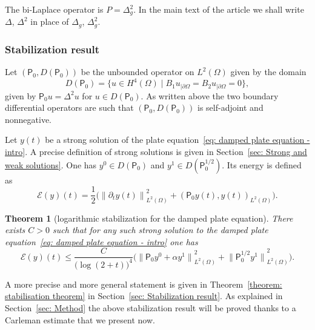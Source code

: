 \documentclass[10pt]{amsart}
\let\sep\mid
\theoremstyle{plain}
\newtheorem{theorem}{Theorem}[section]
\theoremstyle{definition}
\newcommand{\inp}[2]{(#1, #2)}
\newcommand{\E}{\ensuremath{\mathcal E}}
\newcommand{\Norm}[2]{{\| #1 \|}_{#2}}
\newcommand{\Pell}{\mathsf P_0}
\begin{document}
The bi-Laplace operator is $P= \Delta^2_g$. In the main text of the
article we shall write $\Delta$, $\Delta^2$ in place of $\Delta_g$, $\Delta_g^2$.

\subsubsection{Stabilization result}

Let $(\Pell, D(\Pell))$ be the unbounded operator on $L^2(\Omega)$ given by the domain
\begin{equation}
\label{eq: domain P intro}
D(\Pell) = \big\{ u \in H^4(\Omega)\sep B_1
u_{|\partial \Omega}
= B_2 u_{|\partial \Omega}=0\big\},
\end{equation}
given by $\Pell u = \Delta^2 u$ for $u \in D(\Pell)$. As written above
the two boundary differential operators are such that $(\Pell, D(\Pell))$
is self-adjoint and nonnegative.

Let $y(t)$ be a strong solution of the plate equation~\eqref{eq:
damped plate equation - intro}. A precise definition of strong
solutions is given in Section~\ref{sec: Strong and weak
solutions}. One has $y^0 \in D(\Pell)$ and
$y^1 \in D(\Pell^{1/2})$. Its energy is defined as
\begin{equation*}
\E(y) (t) = \frac12 \big(\Norm{\partial_t y (t)}{L^2(\Omega)}^2
+ \inp{\Pell y (t)}{y (t)}_{L^2(\Omega)}
\big).
\end{equation*}

\begin{theorem}[logarithmic stabilization for the damped plate equation]
\label{theorem: stabilisation theorem-intro}
There exists $C>0$ such that for any such strong solution to the
damped plate equation~\eqref{eq: damped plate equation - intro} one
has
\begin{equation*}
\E(y)(t) \leq \frac{C}{\big(\log(2+t)\big)^{4}}
\big(\Norm{\Pell y^0+ \alpha y^1}{L^2(\Omega)}^2
+ \Norm{\Pell^{1/2} y^1}{L^2(\Omega)}^2
\big).
\end{equation*}
\end{theorem}
A more precise and more general statement is given in Theorem~\ref{theorem:
stabilisation theorem} in Section~\ref{sec: Stabilization result}.
As explained in Section~\ref{sec: Method} the above stabilization
result will be proved thanks to a Carleman estimate that we present now.
\end{document}
